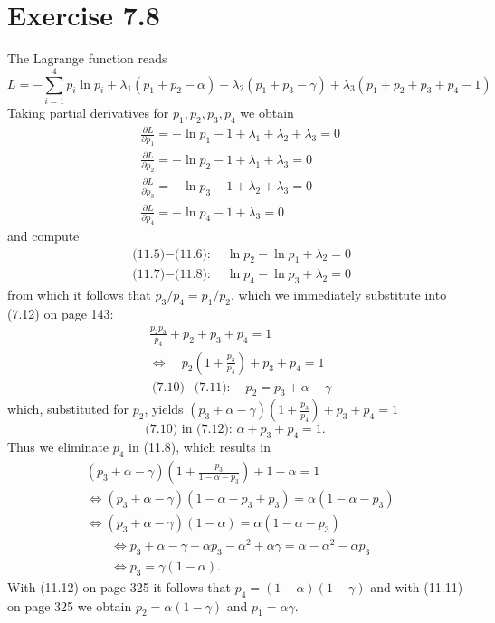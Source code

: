 \documentclass[10pt]{book}
\begin{document}
\section{Exercise 7.8}
The Lagrange function reads
\begin{equation*}
L=-\sum_{i=1}^{4} p_{i} \ln p_{i}+\lambda_{1}\left(p_{1}+p_{2}-\alpha\right)+\lambda_{2}\left(p_{1}+p_{3}-\gamma\right)+\lambda_{3}\left(p_{1}+p_{2}+p_{3}+p_{4}-1\right) \tag{11.4}
\end{equation*}
Taking partial derivatives for $p_{1}, p_{2}, p_{3}, p_{4}$ we obtain
\begin{align*}
& \frac{\partial L}{\partial p_{1}}=-\ln p_{1}-1+\lambda_{1}+\lambda_{2}+\lambda_{3}=0  \tag{11.5}\\
& \frac{\partial L}{\partial p_{2}}=-\ln p_{2}-1+\lambda_{1}+\lambda_{3}=0  \tag{11.6}\\
& \frac{\partial L}{\partial p_{3}}=-\ln p_{3}-1+\lambda_{2}+\lambda_{3}=0  \tag{11.7}\\
& \frac{\partial L}{\partial p_{4}}=-\ln p_{4}-1+\lambda_{3}=0 \tag{11.8}
\end{align*}
and compute
\begin{align*}
& \text{(11.5)$-$(11.6):} \quad \ln p_{2}-\ln p_{1}+\lambda_{2}=0  \tag{11.9}\\
& \text{(11.7)$-$(11.8):} \quad \ln p_{4}-\ln p_{3}+\lambda_{2}=0 \tag{11.10}
\end{align*}
from which it follows that $p_{3} / p_{4}=p_{1} / p_{2}$, which we immediately substitute into (7.12) on page 143:
\[
\begin{aligned}
& \frac{p_{2} p_{3}}{p_{4}}+p_{2}+p_{3}+p_{4}=1 \\
& \Leftrightarrow \quad p_{2}\left(1+\frac{p_{3}}{p_{4}}\right)+p_{3}+p_{4}=1 \tag{11.11}\\
& \text{(7.10)$-$(7.11):} \quad p_{2}=p_{3}+\alpha-\gamma
\end{aligned}
\]
which, substituted for $p_{2}$, yields $\left(p_{3}+\alpha-\gamma\right)\left(1+\frac{p_{3}}{p_{4}}\right)+p_{3}+p_{4}=1$
\begin{equation*}
\text{(7.10) in (7.12): } \alpha+p_{3}+p_{4}=1. \tag{11.12}
\end{equation*}
Thus we eliminate $p_{4}$ in (11.8), which results in
\begin{align*}
& \left(p_{3}+\alpha-\gamma\right)\left(1+\frac{p_{3}}{1-\alpha-p_{3}}\right)+1-\alpha=1  \tag{11.13}\\
& \Leftrightarrow\left(p_{3}+\alpha-\gamma\right)\left(1-\alpha-p_{3}+p_{3}\right)=\alpha\left(1-\alpha-p_{3}\right)  \tag{11.14}\\
& \Leftrightarrow\left(p_{3}+\alpha-\gamma\right)(1-\alpha)=\alpha\left(1-\alpha-p_{3}\right) \tag{11.15}
\end{align*}
\begin{align*}
& \Leftrightarrow p_{3}+\alpha-\gamma-\alpha p_{3}-\alpha^{2}+\alpha \gamma=\alpha-\alpha^{2}-\alpha p_{3}  \tag{11.16}\\
& \Leftrightarrow p_{3}=\gamma(1-\alpha). \tag{11.17}
\end{align*}
With (11.12) on page 325 it follows that $p_{4}=(1-\alpha)(1-\gamma)$ and with (11.11) on page 325 we obtain $p_{2}=\alpha(1-\gamma)$ and $p_{1}=\alpha \gamma$.
\end{document}
